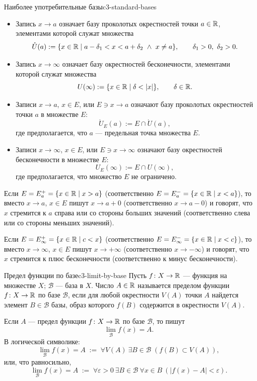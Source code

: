 \begin{properties}{Наиболее употребительные базы}{c3-standard-bases}
  \begin{itemize}
    \item Запись $x\to a$ означает базу проколотых окрестностей точки
      $a\in\mathbb{R}$, элементами которой служат множества
      \[
        \mathring U(a):=
        \{x\in\mathbb{R}\mid a-\delta_1<x<a+\delta_2\ \land\ x\ne a\},
        \qquad \delta_1>0,\ \delta_2>0.
      \]
    \item Запись $x\to\infty$ означает базу окрестностей бесконечности,
      элементами которой служат множества
      \[
        U(\infty):=\{x\in\R\mid \delta<|x|\},
        \qquad \delta\in\R.
      \]
    \item Записи $x\to a$, $x\in E$, или $E\ni x\to a$ означают базу
      проколотых окрестностей точки $a$ в множестве $E$:
      \[
        \mathring U_E(a):=E\cap\mathring U(a),
      \]
      где предполагается, что $a$ — предельная точка множества $E$.
    \item Записи $x\to\infty$, $x\in E$, или $E\ni x\to\infty$ означают
      базу окрестностей бесконечности в множестве $E$:
      \[
        U_E(\infty):=E\cap U(\infty),
      \]
      где предполагается, что множество $E$ не ограничено.
  \end{itemize}

  Если $E=E_a^+=\{x\in\mathbb{R}\mid x>a\}$
  (соответственно $E=E_a^-=\{x\in\mathbb{R}\mid x<a\}$), то вместо $x\to a$,
  $x\in E$ пишут $x\to a+0$ (соответственно $x\to a-0$) и говорят, что
  $x$ стремится к $a$ справа или со стороны больших значений
  (соответственно слева или со стороны меньших значений).

  Если $E=E_\infty^+=\{x\in\mathbb{R}\mid c<x\}$
  (соответственно $E=E_\infty^-=\{x\in\mathbb{R}\mid x<c\}$), то вместо
  $x\to\infty$, $x\in E$ пишут $x\to+\infty$ (соответственно
  $x\to-\infty$) и говорят, что $x$ стремится к плюс бесконечности
  (соответственно к минус бесконечности).
\end{properties}

\begin{definition}{Предел функции по базе}{c3-limit-by-base}
  Пусть $f\colon X\to\mathbb{R}$ — функция на множестве $X$; $\mathcal B$ —
  база в $X$. Число $A\in\mathbb{R}$ называется пределом функции
  $f\colon X\to\mathbb{R}$ по базе $\mathcal B$, если для любой окрестности $V(A)$
  точки $A$ найдется элемент $B\in\mathcal B$ базы, образ которого $f(B)$
  содержится в окрестности $V(A)$.

  Если $A$ — предел функции $f\colon X\to\mathbb{R}$ по базе $\mathcal B$, то
  пишут
  \[
    \lim_{\mathcal B}f(x)=A.
  \]
  В логической символике:
  \[
    \lim_{\mathcal B}f(x)=A
    \;:=\;
    \forall V(A)\ \exists B\in\mathcal B\;(f(B)\subset V(A)),
  \]
  или, что равносильно,
  \[
    \lim_{\mathcal B}f(x)=A
    \;:=\;
    \forall\varepsilon>0\ \exists B\in\mathcal B\ \forall x\in B\
    (|f(x)-A|<\varepsilon).
  \]
\end{definition}

